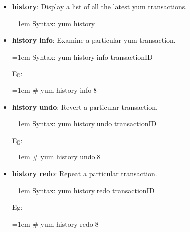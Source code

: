 \begin{flushleft}
\begin{itemize}
		\item \textbf{history}: Display a list of all the latest yum transactions.
		\begin{tcolorbox}[breakable,notitle,boxrule=-0pt,colback=pink,colframe=pink]
			\color{black}
			\font=1em
			Syntax: yum history
			\font=4pt
		\end{tcolorbox}
		\bigskip
		\bigskip			

		\item \textbf{history info}: Examine a particular yum transaction.
		\begin{tcolorbox}[breakable,notitle,boxrule=-0pt,colback=pink,colframe=pink]
			\color{black}
			\font=1em
			Syntax: yum history info transactionID
			\font=4pt
		\end{tcolorbox}
		Eg:
		\begin{tcolorbox}[breakable,notitle,boxrule=-0pt,colback=black,colframe=black]
			\color{green}
			\font=1em
			\# yum history info 8
			\font=4pt
		\end{tcolorbox}
		\bigskip
		\bigskip			

		\item \textbf{history undo}: Revert a particular transaction.
		\begin{tcolorbox}[breakable,notitle,boxrule=-0pt,colback=pink,colframe=pink]
			\color{black}
			\font=1em
			Syntax: yum history undo transactionID
			\font=4pt
		\end{tcolorbox}
		Eg:
		\begin{tcolorbox}[breakable,notitle,boxrule=-0pt,colback=black,colframe=black]
			\color{green}
			\font=1em
			\# yum history undo 8
			\font=4pt
		\end{tcolorbox}
		\bigskip
		\bigskip			

		\item \textbf{history redo}: Repeat a particular transaction.
		\begin{tcolorbox}[breakable,notitle,boxrule=-0pt,colback=pink,colframe=pink]
			\color{black}
			\font=1em
			Syntax: yum history redo transactionID
			\font=4pt
		\end{tcolorbox}
		Eg:
		\begin{tcolorbox}[breakable,notitle,boxrule=-0pt,colback=black,colframe=black]
			\color{green}
			\font=1em
			\# yum history redo 8
			\font=4pt
		\end{tcolorbox}
		\bigskip
		\bigskip					
		

\end{itemize}
\end{flushleft}
